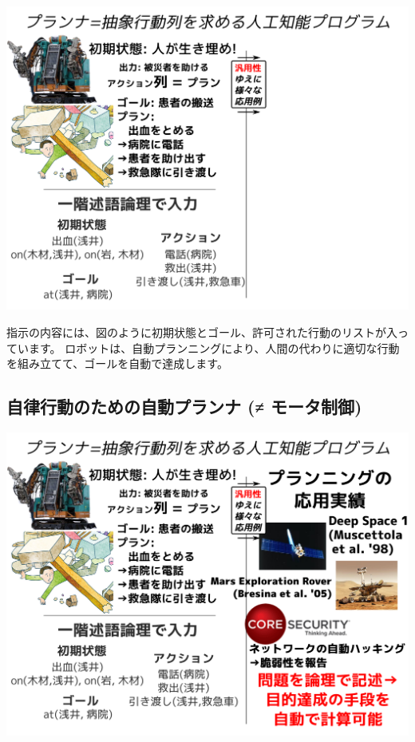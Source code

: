 \includegraphics{img/planning/2.png}

\begin{resume}
指示の内容には、図のように初期状態とゴール、許可された行動のリストが入っています。
ロボットは、自動プランニングにより、人間の代わりに適切な行動を組み立てて、ゴールを自動で達成します。
\end{resume}

\subsection{自律行動のための自動プランナ (≠ モータ制御)}
\label{sec-1-4}

\includegraphics{img/planning/final.png}

